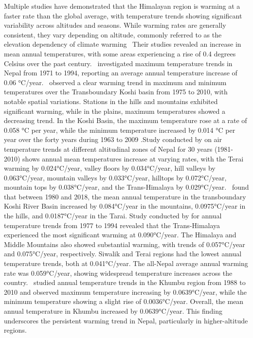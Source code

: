 Multiple studies have demonstrated that the Himalayan region is warming at a faster rate than the global average, with temperature trends showing significant variability across altitudes and seasons. While warming rates are generally consistent, they vary depending on altitude, commonly referred to as the elevation dependency of climate warming~\textcite{hingane_longterm_1985,shrestha_observed_2017,Sabin2020,} Their studies revealed an increase in mean annual temperatures, with some areas experiencing a rise of 0.4 degrees Celsius over the past century.~\textcite{shrestha_maximum_1999} investigated maximum temperature trends in Nepal from 1971 to 1994, reporting an average annual temperature increase of 0.06 °C/year.~\textcite{shrestha_observed_2017} observed a clear warming trend in maximum and minimum temperatures over the Transboundary Koshi basin from 1975 to 2010, with notable spatial variations. Stations in the hills and mountains exhibited significant warming, while in the plains, maximum temperatures showed a decreasing trend. In the Koshi Basin, the maximum temperature rose at a rate of 0.058 °C per year, while the minimum temperature increased by 0.014 °C per year over the forty years during 1963 to 2009 \parencite{nepal_impacts_2016}.Study conducted by \textcite{nayava_spatial_2017} on air temperature trends at different altitudinal zones of Nepal for 30 years (1981-2010) shows annual mean temperatures increase at varying rates, with the Terai warming by 0.024°C/year, valley floors by 0.034°C/year, hill valleys by 0.063°C/year, mountain valleys by 0.033°C/year, hilltops by 0.072°C/year, mountain tops by 0.038°C/year, and the Trans-Himalaya by 0.029°C/year.~\textcite{paudel_climate_2021} found that between 1980 and 2018, the mean annual temperature in the transboundary Koshi River Basin increased by 0.084°C/year in the mountains, 0.0975°C/year in the hills, and 0.0187°C/year in the Tarai. Study conducted by \textcite{shrestha_maximum_1999} for annual temperature trends from 1977 to 1994 revealed that the Trans-Himalaya experienced the most significant warming at 0.090°C/year. The Himalaya and Middle Mountains also showed substantial warming, with trends of 0.057°C/year and 0.075°C/year, respectively. Siwalik and Terai regions had the lowest annual temperature trends, both at 0.041°C/year. The all-Nepal average annual warming rate was 0.059°C/year, showing widespread temperature increases across the country.~\textcite{adhikari_x_2016} studied annual temperature trends in the Khumbu region from 1988 to 2010 and observed maximum temperature increasing by 0.0639°C/year, while the minimum temperature showing a slight rise of 0.0036°C/year. Overall, the mean annual temperature in Khumbu increased by 0.0639°C/year. This finding underscores the persistent warming trend in Nepal, particularly in higher-altitude regions.


